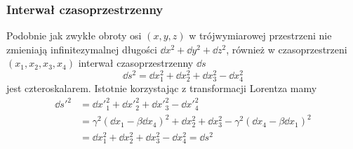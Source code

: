 \documentclass[../main.tex]{subfiles}
\begin{document}
\subsubsection{Interwał czasoprzestrzenny}
Podobnie jak zwykłe obroty osi \((x,y,z)\) w trójwymiarowej przestrzeni nie zmieniają
infinitezymalnej długości \(\dd{x}^2+\dd{y}^2+\dd{z}^2\), również w czasoprzestrzeni
\((x_1,x_2,x_3,x_4)\) interwał czasoprzestrzenny \(\dd{s}\)
\begin{equation*}
    \dd{s}^2=\dd{x}_1^2+\dd{x}_2^2+\dd{x}_3^2-\dd{x}_4^2
\end{equation*}
jest czteroskalarem. Istotnie korzystając z transformacji Lorentza mamy
\begin{equation*}
\begin{split}
    \dd{s'}^2&=\dd{x'}_1^2+\dd{x'}_2^2+\dd{x'}_3^2-\dd{x'}_4^2\\
    &=\gamma^2(\dd{x}_1-\beta\dd{x}_4)^2+\dd{x}_2^2+\dd{x}_3^2-\gamma^2(\dd{x}_4-\beta\dd{x}_1)^2\\
    &=\dd{x}_1^2+\dd{x}_2^2+\dd{x}_3^2-\dd{x}_4^2=\dd{s}^2
\end{split}
\end{equation*}
\end{document}
